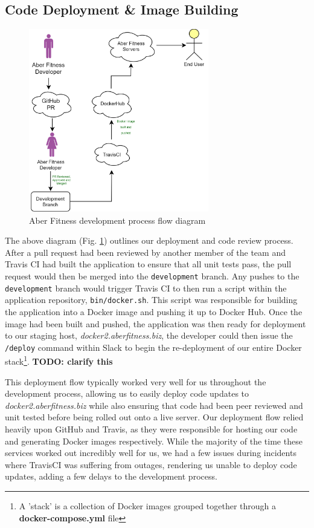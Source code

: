 
\subsection{Code Deployment \& Image Building}
\begin{figure}[H]
    \centering
    \includegraphics[width=0.7\textwidth]{Images/diagram_af.png}
    \caption{Aber Fitness development process flow diagram}
    \label{fig:development_flow_diagram}
\end{figure}

The above diagram (Fig. \ref{fig:development_flow_diagram}) outlines our deployment and code review process. After a pull request had been reviewed by another member of the team and Travis CI had built the application to ensure that all unit tests pass, the pull request would then be merged into the \lstinline{development} branch. Any pushes to the \lstinline{development} branch would trigger Travis CI to then run a script within the application repository, \lstinline{bin/docker.sh}. This script was responsible for building the application into a Docker image and pushing it up to Docker Hub. Once the image had been built and pushed, the application was then ready for deployment to our staging host, \textit{docker2.aberfitness.biz}, the developer could then issue the \lstinline{/deploy} command within Slack to begin the re-deployment of our entire Docker stack\footnote{A 'stack' is a collection of Docker images grouped together through a \textbf{docker-compose.yml} file}. \textbf{TODO: clarify this}

This deployment flow typically worked very well for us throughout the development process, allowing us to easily deploy code updates to \textit{docker2.aberfitness.biz} while also ensuring that code had been peer reviewed and unit tested before being rolled out onto a live server. Our deployment flow relied heavily upon GitHub and Travis, as they were responsible for hosting our code and generating Docker images respectively. While the majority of the time these services worked out incredibly well for us, we had a few issues during incidents where TravisCI was suffering from outages, rendering us unable to deploy code updates, adding a few delays to the development process.


